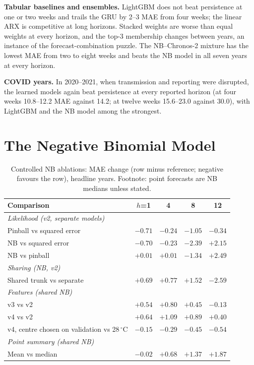 \textbf{Tabular baselines and ensembles.} LightGBM does not beat persistence at one or two weeks and trails the GRU by 2--3 MAE from four weeks; the linear ARX is competitive at long horizons. Stacked weights are worse than equal weights at every horizon, and the top-3 membership changes between years, an instance of the forecast-combination puzzle. The NB--Chronos-2 mixture has the lowest MAE from two to eight weeks and beats the NB model in all seven years at every horizon.

\textbf{COVID years.} In 2020--2021, when transmission and reporting were disrupted, the learned models again beat persistence at every reported horizon (at four weeks 10.8--12.2 MAE against 14.2; at twelve weeks 15.6--23.0 against 30.0), with LightGBM and the NB model among the strongest.

\section{The Negative Binomial Model}
\label{sec:nbresults}

\begin{table}[t]
\centering
\caption{Controlled NB ablations: MAE change (row minus reference; negative favours the row), headline years. Footnote: point forecasts are NB medians unless stated.}
\label{tab:nb}
\small
\setlength{\tabcolsep}{3pt}
\begin{tabular}{lcccc}
\toprule
\textbf{Comparison} & $h$=1 & 4 & 8 & 12 \\
\midrule
\multicolumn{5}{l}{\emph{Likelihood (v2, separate models)}} \\
Pinball vs squared error & $-0.71$ & $-0.24$ & $-1.05$ & $-0.34$ \\
NB vs squared error & $-0.70$ & $-0.23$ & $-2.39$ & $+2.15$ \\
NB vs pinball & $+0.01$ & $+0.01$ & $-1.34$ & $+2.49$ \\
\multicolumn{5}{l}{\emph{Sharing (NB, v2)}} \\
Shared trunk vs separate & $+0.69$ & $+0.77$ & $+1.52$ & $-2.59$ \\
\multicolumn{5}{l}{\emph{Features (shared NB)}} \\
v3 vs v2 & $+0.54$ & $+0.80$ & $+0.45$ & $-0.13$ \\
v4 vs v2 & $+0.64$ & $+1.09$ & $+0.89$ & $+0.40$ \\
v4, centre chosen on validation vs 28\,$^\circ$C & $-0.15$ & $-0.29$ & $-0.45$ & $-0.54$ \\
\multicolumn{5}{l}{\emph{Point summary (shared NB)}} \\
Mean vs median & $-0.02$ & $+0.68$ & $+1.37$ & $+1.87$ \\
\bottomrule
\end{tabular}
\end{table}

